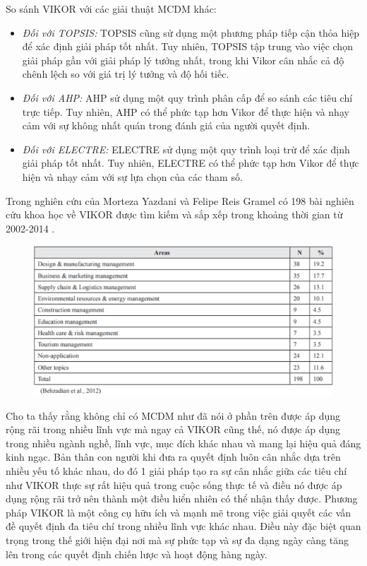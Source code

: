 So sánh VIKOR với các giải thuật MCDM khác: 
\begin{itemize}
    \item \textit{Đối với TOPSIS:} TOPSIS cũng sử dụng một phương pháp tiếp cận thỏa hiệp để xác định giải pháp tốt nhất. Tuy nhiên, TOPSIS tập trung vào việc chọn giải pháp gần với giải pháp lý tưởng nhất, trong khi Vikor cân nhắc cả độ chênh lệch so với giá trị lý tưởng và độ hối tiếc.
    \item \textit{Đối với AHP:} AHP sử dụng một quy trình phân cấp để so sánh các tiêu chí trực tiếp. Tuy nhiên, AHP có thể phức tạp hơn Vikor để thực hiện và nhạy cảm với sự không nhất quán trong đánh giá của người quyết định.
    \item \textit{Đối với ELECTRE:} ELECTRE sử dụng một quy trình loại trừ để xác định giải pháp tốt nhất. Tuy nhiên, ELECTRE có thể phức tạp hơn Vikor để thực hiện và nhạy cảm với sự lựa chọn của các tham số.
\end{itemize}

 Trong nghiên cứu của  Morteza Yazdani và Felipe Reis Gramel có 198 bài nghiên cứu khoa học về VIKOR được tìm kiếm và sắp xếp trong khoảng thời gian từ 2002-2014 \cite{morteza}. 
 \begin{figure}[h]
     \centering
     \includegraphics[width=0.8\linewidth,height=0.35\textheight]{images/VIKORtable.png}
 \end{figure}
Cho ta thấy rằng không chỉ có MCDM như đã nói ở phần trên được áp dụng rộng rãi trong nhiều lĩnh vực mà ngay cả VIKOR cũng thế, nó được áp dụng trong nhiều ngành nghề, lĩnh vực, mục đích khác nhau và mang lại hiệu quả đáng kinh ngạc. Bản thân con người khi đưa ra quyết định luôn cân nhắc dựa trên nhiều yếu tố khác nhau, do đó 1 giải pháp tạo ra sự cân nhắc giữa các tiêu chí như VIKOR thực sự rất hiệu quả trong cuộc sống thực tế và điều nó được áp dụng rộng rãi trở nên thành một điều hiển nhiên có thể nhận thấy được.
Phương pháp VIKOR là một công cụ hữu ích và mạnh mẽ trong việc giải quyết các vấn đề quyết định đa tiêu chí trong nhiều lĩnh vực khác nhau. Điều này đặc biệt quan trọng trong thế giới hiện đại nơi mà sự phức tạp và sự đa dạng ngày càng tăng lên trong các quyết định chiến lược và hoạt động hàng ngày.

